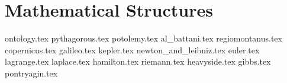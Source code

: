   \part{Mathematical Structures}

  {ontology.tex}
  {pythagorous.tex}
  {potolemy.tex}
  {al_battani.tex}
  {regiomontanus.tex}
  {copernicus.tex}
  {galileo.tex}
  {kepler.tex}
  {newton_and_leibniz.tex}
  {euler.tex}
  {lagrange.tex}
  {laplace.tex}
  {hamilton.tex}
  {riemann.tex}
  {heavyside.tex}
  {gibbs.tex}
  {pontryagin.tex}